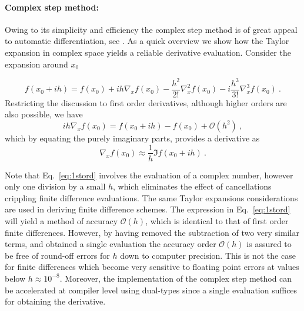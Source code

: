 \documentclass{article}
\begin{document}
\paragraph{Complex step method:}
Owing to its simplicity and efficiency the complex step method is of great appeal to automatic differentiation, see \cite{fike2012automatic}. As a quick overview we show how the Taylor expansion in complex space yields a reliable derivative evaluation. Consider the expansion around $x_0$

$$
f(x_0+ih)=f(x_0)+ih\nabla_{x}f(x_0)-\frac{h^2}{2!}\nabla^2_{x}f(x_0)-i\frac{h^3}{3!}\nabla^3_{x}f(x_0)\ .
$$
Restricting the discussion to first order derivatives, although higher orders are also possible, we have
\begin{equation*}\label{eq:taylor}
    ih\nabla_{x}f(x_0)=f(x_0+ih)-f(x_0)+\mathcal O(h^2)\ ,
\end{equation*}
which by equating the purely imaginary parts, provides a derivative as
\begin{equation}\label{eq:1stord}
\nabla_{x}f(x_0)\approx\frac{1}{h}\Im{f(x_0+ih)} \ .
\end{equation}

Note that Eq.~\ref{eq:1stord} involves the evaluation of a complex number, however only one division by a small $h$, which eliminates the effect of cancellations crippling finite difference evaluations. The same Taylor expansions considerations are used in deriving finite difference schemes. The expression in Eq.~\ref{eq:1stord} will yield a method of accuracy $\mathcal O(h)$, which is identical to that of first order finite differences. However, by having removed the subtraction of two very similar terms, and obtained a single evaluation the accuracy order $\mathcal O(h)$ is assured to be free of round-off errors for $h$ down to computer precision. This is not the case for finite differences which become very sensitive to floating point errors at values below $h\approx 10^{-8}$. Moreover, the implementation of the complex step method can be accelerated at compiler level using dual-types since a single evaluation suffices for obtaining the derivative.  
\end{document}
